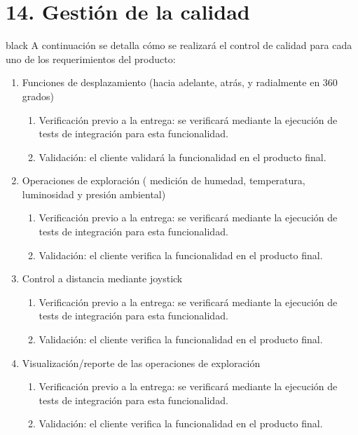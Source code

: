 \documentclass[
11pt, %
]{charter}
\begin{document}
\section{14. Gestión de la calidad}
\label{sec:calidad}
\begin{consigna}{black}
A continuación se detalla cómo se realizará el control de calidad para cada uno de los requerimientos del producto:
\begin{enumerate}	
			
		\item Funciones de desplazamiento (hacia adelante, atrás, y radialmente en 360 grados)
		\begin{enumerate}				
			\item Verificación previo a la entrega: se verificará mediante la ejecución de tests de integración para esta funcionalidad.			
			\item Validación: el cliente validará la funcionalidad en el producto final.			
		\end{enumerate}		
		\item Operaciones de exploración ( medición de humedad, temperatura, luminosidad y presión ambiental)
		\begin{enumerate}				
			\item Verificación previo a la entrega: se verificará mediante la ejecución de tests de integración para esta funcionalidad.			
			\item Validación: el cliente verifica la funcionalidad en el producto final.			
		\end{enumerate}		
		\item Control a distancia mediante joystick
		\begin{enumerate}				
			\item Verificación previo a la entrega: se verificará mediante la ejecución de tests de integración para esta funcionalidad.			
			\item Validación: el cliente verifica la funcionalidad en el producto final.			
		\end{enumerate}			
		\item Visualización/reporte de las operaciones de exploración 
		\begin{enumerate}				
			\item Verificación previo a la entrega: se verificará mediante la ejecución de tests de integración para esta funcionalidad.			
			\item Validación: el cliente verifica la funcionalidad en el producto final.			
		\end{enumerate}			

\end{enumerate}
\end{consigna}
\end{document}

